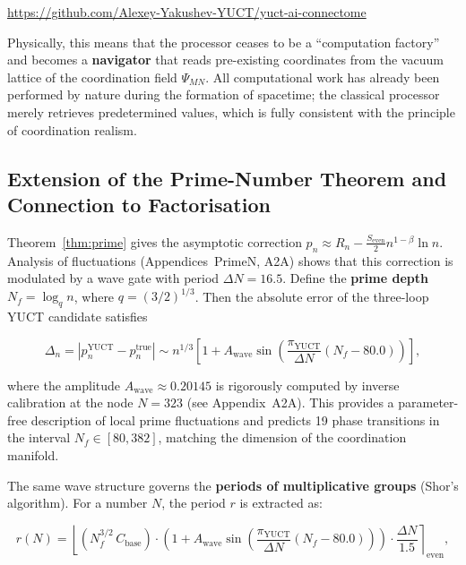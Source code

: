 \documentclass[12pt,a4paper]{article}
\theoremstyle{remark}
\newcommand{\piYUCT}{\pi_{\mathrm{YUCT}}}
\begin{document}
	\begin{center}
		\url{https://github.com/Alexey-Yakushev-YUCT/yuct-ai-connectome}
	\end{center}
	
	Physically, this means that the processor ceases to be a ``computation factory'' and becomes a \textbf{navigator} that reads pre-existing coordinates from the vacuum lattice of the coordination field \(\Psi_{MN}\). All computational work has already been performed by nature during the formation of spacetime; the classical processor merely retrieves predetermined values, which is fully consistent with the principle of coordination realism.
	
	\subsection{Extension of the Prime-Number Theorem and Connection to Factorisation}
	\label{subsec:prime-extension}
	
	Theorem~\ref{thm:prime} gives the asymptotic correction \(p_n \approx R_n - \frac{S_{\mathrm{even}}}{2} n^{1-\beta}\ln n\). Analysis of fluctuations (Appendices~PrimeN, A2A) shows that this correction is modulated by a wave gate with period \(\Delta N = 16.5\). Define the \textbf{prime depth} \(N_f = \log_q n\), where \(q = (3/2)^{1/3}\). Then the absolute error of the three-loop YUCT candidate satisfies
	
	\begin{equation}
		\Delta_n = \left| p_n^{\mathrm{YUCT}} - p_n^{\mathrm{true}} \right|
		\sim n^{1/3} \left[ 1 + A_{\text{wave}} \sin\!\left( \frac{\piYUCT}{\Delta N} (N_f - 80.0) \right) \right],
		\label{eq:prime_wave}
	\end{equation}
	
	where the amplitude \(A_{\text{wave}} \approx 0.20145\) is rigorously computed by inverse calibration at the node \(N=323\) (see Appendix~A2A). This provides a parameter-free description of local prime fluctuations and predicts 19 phase transitions in the interval \(N_f \in [80, 382]\), matching the dimension of the coordination manifold.
	
	The same wave structure governs the \textbf{periods of multiplicative groups} (Shor's algorithm). For a number \(N\), the period \(r\) is extracted as:
	
	\begin{equation}
		r(N) = \left\lfloor (N_f^{3/2} \, C_{\text{base}}) \cdot
		\left(1 + A_{\text{wave}} \sin\left( \frac{\piYUCT}{\Delta N} (N_f - 80.0) \right) \right) \cdot \frac{\Delta N}{1.5} \right\rceil_{\text{even}},
		\label{eq:shor_period}
	\end{equation}
	
\end{document}
